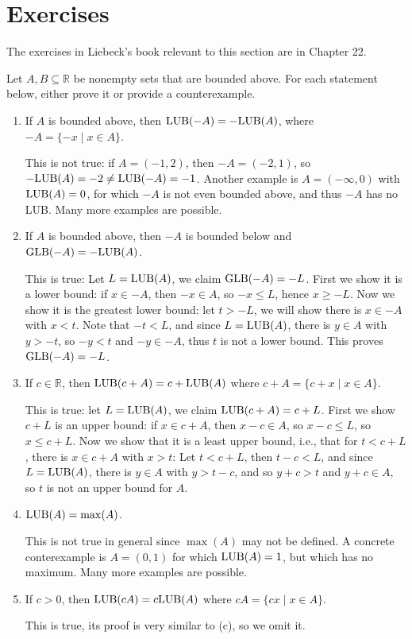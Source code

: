 \documentclass[11pt,dvipsnames]{book}
\numberwithin{equation}{section} %
\numberwithin{figure}{section} %
\numberwithin{table}{section} %
\begin{document}

\section{Exercises}


The exercises in Liebeck's book relevant to this section are in Chapter 22.

\begin{exercise}
Let $A,B\subseteq \mathbb{R}$ be nonempty sets that are bounded above. For each statement below, either prove it or provide a counterexample.
\begin{enumerate}[label=(\alph*)]
\item If $A$ is bounded above, then ${\rm LUB}(-A)=-{\rm LUB}(A)$, where $-A=\{-x \; | \; x\in A\}$.
\begin{solution}
This is not true: if $A=(-1,2)$, then $-A=(-2,1)$, so $-{\rm LUB}(A)=-2\neq {\rm LUB}(-A)=-1$. Another example is $A = (-\infty, 0)$ with ${\rm LUB}(A) = 0$, for which $-A$ is not even bounded above, and thus $-A$ has no LUB. Many more examples are possible.
\end{solution}
\item If $A$ is bounded above, then $-A$ is bounded below and ${\rm GLB}(-A)=-{\rm LUB}(A)$.
\begin{solution}
This is true: Let $L={\rm LUB}(A)$, we claim ${\rm GLB}(-A)=-L$. First we show it is a lower bound: if $x\in -A$, then $-x\in A$, so $-x\leq L$, hence $x\geq -L$. Now we show it is the greatest lower bound: let $t>-L$, we will show there is $x\in -A$ with $x<t$. Note that $-t<L$, and since $L={\rm LUB}(A)$, there is $y\in A$ with $y>-t$, so $-y<t$ and $-y\in -A$, thus $t$ is not a lower bound. This proves ${\rm GLB}(-A)=-L$.
\end{solution}
\item If $c\in \mathbb{R}$, then ${\rm LUB}(c+A)=c+{\rm LUB}(A)$ where $c+A=\{c+x \; | \; x\in A\}$. 
\begin{solution}
This is true: let $L={\rm LUB}(A)$, we claim ${\rm LUB}(c+A)=c+L$. First we show $c+L$ is an upper bound: if $x\in c+A$, then $x-c\in A$, so $x-c\leq L$, so $x\leq c+L$. Now we show that it is a least upper bound, i.e., that for $t<c+L$, there is $x\in c+A$ with $x>t$: Let $t<c+L$, then $t-c<L$, and since $L={\rm LUB}(A)$, there is $y\in A$ with $y>t-c$, and so $y+c>t$ and $y+c\in A$, so $t$ is not an upper bound for $A$.
\end{solution}
\item ${\rm LUB}(A)=\max(A)$. 
\begin{solution}
This is not true in general since $\max(A)$ may not be defined. A concrete conterexample is $A = (0,1)$ for which ${\rm LUB}(A) =1$, but which has no maximum. Many more examples are possible.
\end{solution}
\item If $c>0$, then ${\rm LUB}(cA)=c{\rm LUB}(A)$ where $cA=\{cx\; | \; x\in A\}$. 
\begin{solution}
This is true, its proof is very similar to (c), so we omit it.
\end{solution}


\end{enumerate}
\end{exercise}
\end{document}
